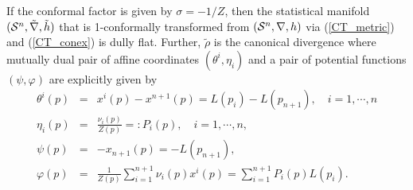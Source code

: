 \documentclass{llncs}
\begin{document}
\begin{proposition}
\label{prop:1}
If the conformal factor is given by $\sigma=-1/Z$, 
then the statistical manifold $({\cal S}^n,\tilde \nabla, \tilde h)$ 
that is 1-conformally transformed from $({\cal S}^n,\nabla,h)$ 
via (\ref{CT_metric}) and (\ref{CT_conex}) is dully flat.
Further, $\tilde \rho$ is the canonical divergence 
where mutually dual pair of affine coordinates $(\theta^i, \eta_i)$ 
and a pair of potential functions $(\psi, \varphi)$ are explicitly given by
\begin{eqnarray}
	\theta^i(p) &=& x^i(p)-x^{n+1}(p)=L(p_i)-L(p_{n+1}), \quad i=1,\cdots,n \\
	\eta_i(p) &=& \frac{\nu_i(p)}{Z(p)}=: P_i(p), \quad i=1,\cdots,n, \\
	\psi(p) &=& -x_{n+1}(p)=-L(p_{n+1}), \\
	\varphi(p) &=& \frac{1}{Z(p)} \sum_{i=1}^{n+1} \nu_i(p)x^i(p)
			= \sum_{i=1}^{n+1} P_i(p)L(p_i).
\end{eqnarray}
\end{proposition}
\end{document}
